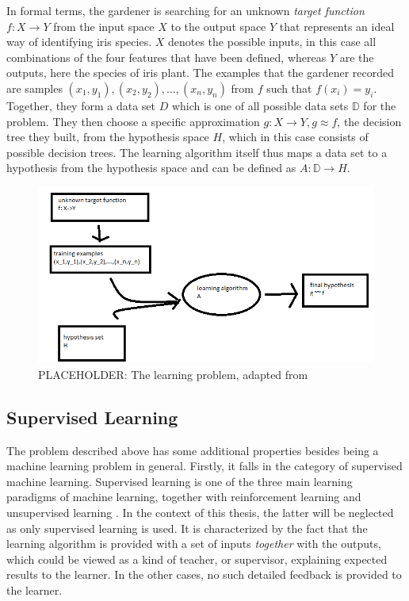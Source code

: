 In formal terms, the gardener is searching for an unknown \textit{target function} $f:X \rightarrow Y$ from the input space $X$ to the output space $Y$ \cite{abu2012learning} that represents an ideal way of identifying iris species. $X$ denotes the possible inputs, in this case all combinations of the four features that have been defined, whereas $Y$ are the outputs, here the species of iris plant. The examples that the gardener recorded are samples $(x_1,y_1),(x_2,y_2),\dots,(x_n,y_n)$ from $f$ such that $f(x_i)=y_i$. Together, they form a data set $D$ which is one of all possible data sets $\mathbb{D}$ for the problem. They then choose a specific approximation $g:X \rightarrow Y,g\approx f$, the decision tree they built, from the hypothesis space $H$, which in this case consists of possible decision trees. The learning algorithm itself thus maps a data set to a hypothesis from the hypothesis space and can be defined as $A:\mathbb{D}\rightarrow H$.

\begin{figure}
\includegraphics[width=\textwidth]{gfx/placeholder_learning}
\caption{PLACEHOLDER: The learning problem, adapted from \cite{abu2012learning}}
\label{fig:learning_problem}
\end{figure}

\subsection{Supervised Learning}
The problem described above has some additional properties besides being a machine learning problem in general. Firstly, it falls in the category of supervised machine learning. Supervised learning is one of the three main learning paradigms of machine learning, together with reinforcement learning and unsupervised learning \cite{abu2012learning}. In the context of this thesis, the latter will be neglected as only supervised learning is used. It is characterized by the fact that the learning algorithm is provided with a set of inputs \textit{together} with the outputs, which could be viewed as a kind of teacher, or supervisor, explaining expected results to the learner. In the other cases, no such detailed feedback is provided to the learner. 

